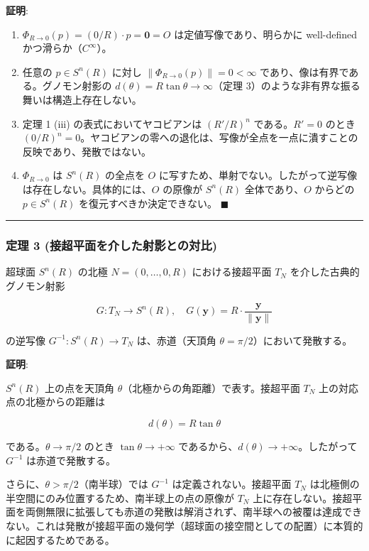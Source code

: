 \documentclass[
  a4paper]{ltjsarticle}
\begin{document}
\textbf{証明}:

\begin{enumerate}
\def\labelenumi{(\roman{enumi})}
\item
  \(\Phi_{R \to 0}(p) = (0/R) \cdot p = \mathbf{0} = O\)
  は定値写像であり、明らかに well-defined かつ滑らか（\(C^\infty\)）。
\item
  任意の \(p \in S^n(R)\) に対し \(\|\Phi_{R \to 0}(p)\| = 0 < \infty\)
  であり、像は有界である。グノモン射影の
  \(d(\theta) = R\tan\theta \to \infty\)（定理
  3）のような非有界な振る舞いは構造上存在しない。
\item
  定理 1 (iii) の表式においてヤコビアンは \((R'/R)^n\)
  である。\(R' = 0\) のとき
  \((0/R)^n = 0\)。ヤコビアンの零への退化は、写像が全点を一点に潰すことの反映であり、発散ではない。
\item
  \(\Phi_{R \to 0}\) は \(S^n(R)\) の全点を \(O\)
  に写すため、単射でない。したがって逆写像は存在しない。具体的には、\(O\)
  の原像が \(S^n(R)\) 全体であり、\(O\) からどの \(p \in S^n(R)\)
  を復元すべきか決定できない。 \(\blacksquare\)
\end{enumerate}

\begin{center}\rule{0.5\linewidth}{0.5pt}\end{center}

\subsubsection{定理 3
(接超平面を介した射影との対比)}\label{ux5b9aux7406-3-ux63a5ux8d85ux5e73ux9762ux3092ux4ecbux3057ux305fux5c04ux5f71ux3068ux306eux5bfeux6bd4}

超球面 \(S^n(R)\) の北極 \(N = (0, \ldots, 0, R)\) における接超平面
\(T_N\) を介した古典的グノモン射影

\[
G : T_N \to S^n(R), \quad G(\mathbf{y}) = R \cdot \frac{\mathbf{y}}{\|\mathbf{y}\|}
\]

の逆写像 \(G^{-1} : S^n(R) \to T_N\) は、赤道（天頂角
\(\theta = \pi/2\)）において発散する。

\textbf{証明}:

\(S^n(R)\) 上の点を天頂角 \(\theta\)（北極からの角距離）で表す。接超平面
\(T_N\) 上の対応点の北極からの距離は

\[
d(\theta) = R \tan\theta
\]

である。\(\theta \to \pi/2\) のとき \(\tan\theta \to +\infty\)
であるから、\(d(\theta) \to +\infty\)。したがって \(G^{-1}\)
は赤道で発散する。

さらに、\(\theta > \pi/2\)（南半球）では \(G^{-1}\)
は定義されない。接超平面 \(T_N\)
は北極側の半空間にのみ位置するため、南半球上の点の原像が \(T_N\)
上に存在しない。接超平面を両側無限に拡張しても赤道の発散は解消されず、南半球への被覆は達成できない。これは発散が接超平面の幾何学（超球面の接空間としての配置）に本質的に起因するためである。
\end{document}
